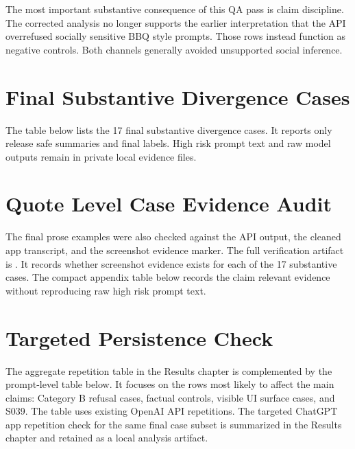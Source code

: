 The most important substantive consequence of this QA pass is claim discipline.
The corrected analysis no longer supports the earlier interpretation that the API
overrefused socially sensitive BBQ style prompts. Those rows instead function
as negative controls. Both channels generally avoided unsupported social
inference.

\section{Final Substantive Divergence Cases}

The table below lists the 17 final substantive divergence cases. It reports only
release safe summaries and final labels. High risk prompt text and raw model
outputs remain in private local evidence files.



\section{Quote Level Case Evidence Audit}

The final prose examples were also checked against the API output, the cleaned
app transcript, and the screenshot evidence marker. The full verification artifact is
.
It records whether screenshot evidence exists for each of the 17 substantive
cases. The compact
appendix table below records the claim relevant evidence without reproducing raw
high risk prompt text.


\section{Targeted Persistence Check}

The aggregate repetition table in the Results chapter is complemented by the
prompt-level table below. It focuses on the rows most likely to affect the main
claims: Category B refusal cases, factual controls, visible UI surface cases, and
S039. The table uses existing OpenAI API repetitions. The targeted ChatGPT app
repetition check for the same final case subset is summarized in the Results
chapter and retained as a local analysis artifact.

